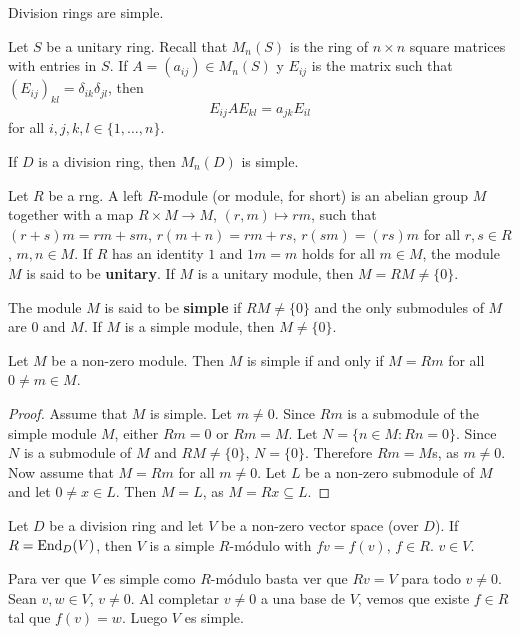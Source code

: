 \begin{example}
	Division rings are simple.
\end{example}

Let $S$ be a unitary ring. Recall that $M_n(S)$ is the ring of $n\times n$ square matrices 
with entries in $S$.  If $A=(a_{ij})\in M_n(S)$ y $E_{ij}$ is the matrix
such that $(E_{ij})_{kl}=\delta_{ik}\delta_{jl}$, then
\begin{equation}
	\label{eq:trick}
E_{ij}AE_{kl}=a_{jk}E_{il}
\end{equation}
for all $i,j,k,l\in\{1,\dots,n\}$. 

\begin{exercise}
	If $D$ is a division ring, then $M_n(D)$ is simple. 
\end{exercise}

Let $R$ be a rng. A left $R$-module (or module, for short)  
is an abelian group $M$ together with a map $R\times M\to M$, $(r,m)\mapsto rm$, such that
$(r+s)m=rm+sm$,
$r(m+n)=rm+rs$, $r(sm)=(rs)m$ for all $r,s\in R$, $m,n\in M$.  If $R$ has an identity 
$1$ and $1m=m$ holds for all $m\in M$, the module $M$ is said to be 
\textbf{unitary}.  If $M$ is a unitary module, then $M=RM\ne\{0\}$.


The module $M$ is said to be 
\textbf{simple} if $RM\ne\{0\}$ and the only submodules of $M$ are $0$ and $M$.
If $M$ is a simple module, then $M\ne\{0\}$.


\begin{lemma}
	\label{lemma:simple}
	Let $M$ be a non-zero module. Then $M$ is simple if and only if $M=Rm$
	for all $0\ne m\in M$.
\end{lemma}

\begin{proof}
	Assume that $M$ is simple.  Let $m\ne 0$. Since $Rm$ is a submodule of the simple 
	module $M$, either $Rm=0$ or $Rm=M$.  Let $N=\{n\in M:Rn=0\}$. Since $N$ is a 
	submodule of $M$ and $RM\ne\{0\}$, $N=\{0\}$. Therefore $Rm=M$s, as $m\ne0$.
	Now assume that $M=Rm$ for all $m\ne0$. Let $L$ be a non-zero submodule of 
	$M$ and let $0\ne x\in L$. Then $M=L$, as $M=Rx\subseteq L$. 
\end{proof} 

\begin{example}
	Let $D$ be a division ring and let $V$ be a non-zero vector space (over $D$). If 
	$R=\operatorname{End}_D(V)$, then $V$ is a simple $R$-módulo with $fv=f(v)$, $f\in R$.
	$v\in V$. 

	Para ver que $V$ es simple como $R$-módulo basta ver que $Rv=V$ para todo
	$v\ne0$. Sean $v,w\in V$, $v\ne0$.  Al completar $v\ne0$ a una base de $V$,
	vemos que existe $f\in R$ tal que $f(v)=w$. Luego $V$ es simple.
\end{example}


